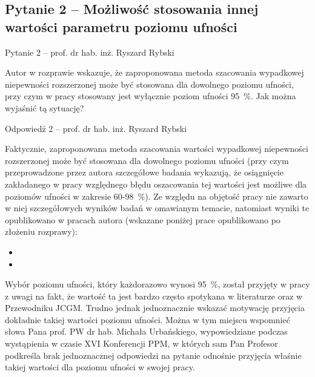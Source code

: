 \documentclass[12pt, polish, aspectratio = 169]{slides}
\begin{document}
\subsection{Pytanie 2 -- Możliwość stosowania innej wartości parametru poziomu ufności}

\begin{frame}{Pytanie 2 -- prof. dr hab. inż. Ryszard Rybski}\large
\begin{justify}
Autor w rozprawie wskazuje, że zaproponowana metoda szacowania wypadkowej niepewności rozszerzonej może być stosowana dla dowolnego poziomu ufności, przy czym w pracy stosowany jest wyłącznie poziom ufności \qty{95}{\percent}. Jak można wyjaśnić tą sytuację?
\end{justify}
\end{frame}

\begin{frame}[allowframebreaks]{Odpowiedź 2 -- prof. dr hab. inż. Ryszard Rybski}\small
\begin{justify}
Faktycznie, zaproponowana metoda szacowania wartości wypadkowej niepewności rozszerzonej może być stosowana dla dowolnego poziomu ufności (przy czym przeprowadzone przez autora szczegółowe badania wykazują, że osiągnięcie zakładanego w pracy względnego błędu oszacowania tej wartości jest możliwe dla poziomów ufności w zakresie \num{60}-\qty{98}{\percent}). Ze względu na objętość pracy nie zawarto w niej szczegółowych wyników badań w omawianym temacie, natomiast wyniki te opublikowano w pracach autora (wskazane poniżej prace opublikowano po złożeniu rozprawy):

\begin{itemize}
\item {}
\item {}
\end{itemize}

Wybór poziomu ufności, który każdorazowo wynosi \qty{95}{\percent}, został przyjęty w pracy z uwagi na fakt, że wartość ta jest bardzo często spotykana w literaturze oraz w Przewodniku JCGM. Trudno jednak jednoznacznie wskazać motywację przyjęcia dokładnie takiej wartości poziomu ufności. Można w tym miejscu wspomnieć słowa Pana prof. PW dr hab. Michała Urbańskiego, wypowiedziane podczas wystąpienia w czasie XVI Konferencji PPM, w których sam Pan Profesor podkreśla brak jednoznacznej odpowiedzi na pytanie odnośnie przyjęcia właśnie takiej wartości dla poziomu ufności w swojej pracy.
\end{justify}
\end{frame}
\end{document}
